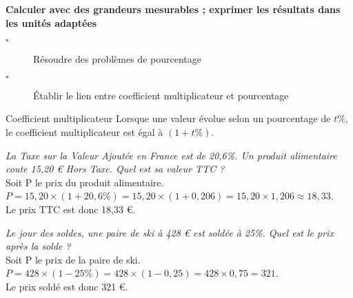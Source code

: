 \begin{titre}[La proportionnalité]

\end{titre}

\begin{CpsCol}
\textbf{Calculer avec des grandeurs mesurables ; exprimer les résultats dans les unités adaptées}
\begin{description}
\item[$\square$] Résoudre des problèmes de pourcentage
\item[$\square$] Établir le lien entre coefficient multiplicateur et pourcentage
\end{description}
\end{CpsCol}


\begin{DefT}{Coefficient multiplicateur}
Lorsque une valeur évolue selon un pourcentage de $t \%$, le coefficient multiplicateur est égal à $(1+t\%)$.
\end{DefT}


\begin{Ex}
\textit{La Taxe sur la Valeur Ajoutée en France est de 20,6\%. Un produit alimentaire coute 15,20 € Hors Taxe. Quel est sa valeur TTC ?}\\
Soit P le prix du produit alimentaire.\\
$P = 15,20 \times (1+20,6\%)= 15,20 \times (1+0,206) = 15,20 \times 1,206 \approx 18,33$.\\
Le prix TTC est donc 18,33 €.
\end{Ex}

\begin{Ex}
\textit{Le jour des soldes, une paire de ski à 428 € est soldée à 25\%. Quel est le prix après la solde ? }\\
Soit P le prix de la paire de ski.\\
$P = 428 \times (1-25\%)= 428 \times (1-0,25) = 428 \times 0,75 =321 $.\\
Le prix soldé est donc 321 €.
\end{Ex}

